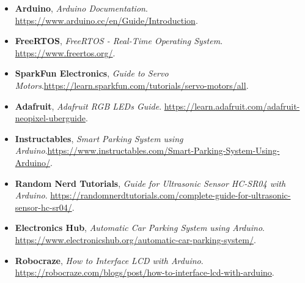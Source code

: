 \documentclass[a4paper,11pt]{report}
\begin{document}
\begin{itemize}
    \item \textbf{Arduino}, \textit{Arduino Documentation}. \url{https://www.arduino.cc/en/Guide/Introduction}.
    
    \item \textbf{FreeRTOS}, \textit{FreeRTOS - Real-Time Operating System}. \url{https://www.freertos.org/}.
    
    \item \textbf{SparkFun Electronics}, \textit{Guide to Servo Motors}.\url{https://learn.sparkfun.com/tutorials/servo-motors/all}.
    
    \item \textbf{Adafruit}, \textit{Adafruit RGB LEDs Guide}. \url{https://learn.adafruit.com/adafruit-neopixel-uberguide}.
    
    \item \textbf{Instructables}, \textit{Smart Parking System using Arduino}.\url{https://www.instructables.com/Smart-Parking-System-Using-Arduino/}.
    
    \item \textbf{Random Nerd Tutorials}, \textit{Guide for Ultrasonic Sensor HC-SR04 with Arduino}. \url{https://randomnerdtutorials.com/complete-guide-for-ultrasonic-sensor-hc-sr04/}.
    
    \item \textbf{Electronics Hub}, \textit{Automatic Car Parking System using Arduino}. \url{https://www.electronicshub.org/automatic-car-parking-system/}.
    
    \item \textbf{Robocraze}, \textit{How to Interface LCD with Arduino}. \url{https://robocraze.com/blogs/post/how-to-interface-lcd-with-arduino}.
\end{itemize}




 
\end{document}
